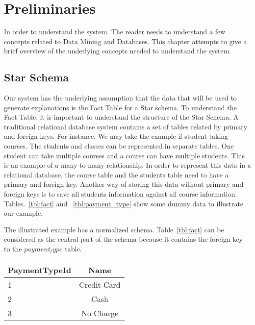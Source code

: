 \chapter{Preliminaries}
\label{chp:prelims}
In order to understand the system. The reader needs to understand a few concepts related to Data Mining and Databases. This chapter attempts to give a brief overview of the underlying concepts needed to understand the system.

\section{Star Schema}
Our system has the underlying assumption that the data that will be used to generate explanations is the Fact Table for a Star schema\citep{giovinazzo2000object,adamson2010star}. To understand the Fact Table, it is important to understand the structure of the Star Schema. A traditional relational database system contains a set of tables related by primary and foreign keys. For instance, We may take the example if student taking courses. The students and classes can be represented in separate tables. One student can take multiple courses and a course can have multiple students. This is an example of a many-to-many relationship. 
In order to represent this data in a relational database, the course table and the students table need to have a primary and foreign key. Another way of storing this data without primary and foreign keys is to save all students information against all course information. Tables.~\ref{tbl:fact} and ~\ref{tbl:payment_type} show some dummy data to illustrate our example.

The illustrated example has a normalized schema\citep{beeri1988sophisticate}. Table~\ref{tbl:fact} can be considered as the central part of the schema because it contains the foreign key to the $payment_type$ table. 



\begin{center}
  \begin{tabular}{ | l | c | }
    \hline
    \textbf{PaymentTypeId} & \textbf{Name} \\ \hline
    1 & Credit Card  \\ \hline
    2 & Cash  \\ \hline
    3 & No Charge  \\
    \hline
  \end{tabular}
\end{center}
\label{tbl:payment_type}

